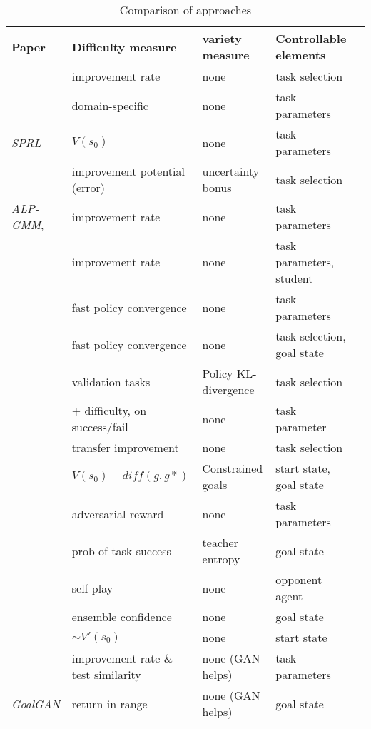 \documentclass[letterpaper]{article}
\theoremstyle{definition}
\begin{document}
\begin{table*}
\caption{Comparison of approaches}
\label{methods-table}
\begin{tabular}{|l | l | l | l  | l|} 
	\hline
	Paper & Difficulty measure & variety measure  & Controllable elements     \\ \hline	
	\cite{Matiisen2020} & improvement rate & none & task selection  \\ \hline
	\cite{Feng2020} & domain-specific & none & task parameters  \\ \hline
	\textit{SPRL} \cite{Klink2020} & $V(s_0)$ & none & task parameters \\ \hline
	\cite{Jiang2020} & improvement potential (error) & uncertainty bonus & task selection  \\ \hline
	\textit{ALP-GMM}, \cite{Portelas2019} &  improvement rate & none & task parameters \\ \hline
	\cite{Portelas2020} & improvement rate & none & task parameters, student  \\ \hline
	\cite{Narvekar2019} & fast policy convergence & none & task parameters \\ \hline
	\cite{Narvekar2020} & fast policy convergence & none & task selection, goal state \\ \hline
	\cite{Gutierrez2020} & validation tasks & Policy KL-divergence & task selection \\ \hline
	\cite{Justesen2018} & $\pm$ difficulty, on success/fail & none & task parameter \\ \hline
	\cite{Jain2017} & transfer improvement & none & task selection \\ \hline
	\cite{Reny2019} & $V(s_0)-diff(g,g*)$ & Constrained goals & start state, goal state \\ \hline
	\cite{Dennis2020} & adversarial reward & none & task parameters \\ \hline
	\cite{Racaniere2019} & prob of task success & teacher entropy & goal state \\ \hline
	\cite{Al-Shedivat2017} & self-play & none & opponent agent \\ \hline
	\cite{Zhang2020} & ensemble confidence & none & goal state \\ \hline
	\cite{Wohlke2020} & $\sim V'(s_0)$ & none & start state \\ \hline
	\cite{Fang2020} & improvement rate \& test similarity & none (GAN helps) & task parameters \\ \hline
	\textit{GoalGAN} \cite{Florensa2018} & return in range & none (GAN helps) & goal state \\ \hline

\end{tabular}
\end{table*}
\end{document}
